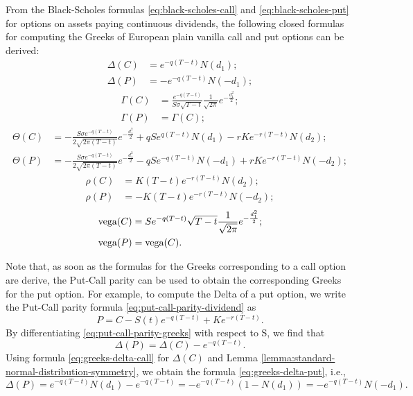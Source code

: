 From the Black-Scholes formulas \eqref{eq:black-scholes-call} and
    \eqref{eq:black-scholes-put} for options on assets paying continuous
    dividends, the following closed formulas for computing the Greeks of
    European plain vanilla call and put options can be derived:
\begin{align}
    \Delta(C) &= e^{-q(T-t)}N(d_1); \label{eq:greeks-delta-call} \\
    \Delta(P) &= -e^{-q(T-t)}N(-d_1); \label{eq:greeks-delta-put}
\end{align}
\begin{align}
    \Gamma(C) &= \frac{e^{-q(T-t)}}{S \sigma \sqrt{T - t}}
        \frac{1}{\sqrt{2 \pi}}e^{-\frac{d_1^2}{2}}; \\
    \Gamma(P) &= \Gamma(C);
\end{align}
\begin{align}
    \Theta(C) &= -\frac{S \sigma e^{-q(T-t)}}{2 \sqrt{2 \pi (T - t)}}
        e^{-\frac{d_1^2}{2}} + q S e^{q(T-t)} N(d_1) -
        r K e^{-r(T-t)} N(d_2); \\
    \Theta(P) &= -\frac{S \sigma e^{-q(T-t)}}{2 \sqrt{2 \pi (T - t)}}
        e^{-\frac{d_1^2}{2}} - q S e^{-q(T-t)} N(-d_1) +
        r K e^{-r(T-t)} N(-d_2);
\end{align}
\begin{align}
    \rho(C) &= K (T - t) e^{-r(T-t)} N(d_2); \\
    \rho(P) &= -K (T - t) e^{-r(T-t)} N(-d_2);
\end{align}
\begin{align}
    \text{vega}(C) &= S e^{-q(T-t)} \sqrt{T - t} \frac{1}{\sqrt{2 \pi}}
        e^{-\frac{d_1^2}{2}}; \\
    \text{vega}(P) &= \text{vega}(C).
\end{align}

Note that, as soon as the formulas for the Greeks corresponding to a call
    option are derive, the Put-Call parity can be used to obtain the
    corresponding Greeks for the put option.
For example, to compute the Delta of a put option, we write the Put-Call parity
    formula \eqref{eq:put-call-parity-dividend} as
\begin{equation}
    P = C - S(t) e^{-q (T - t)} + K e^{-r (T - t)}.
    \label{eq:put-call-parity-greeks}
\end{equation}
By differentiating \eqref{eq:put-call-parity-greeks} with respect to S, we find
    that
\begin{equation*}
    \Delta(P) = \Delta(C) - e^{-q(T-t)}.
\end{equation*}
Using formula \eqref{eq:greeks-delta-call} for $ \Delta(C) $ and Lemma
    \ref{lemma:standard-normal-distribution-symmetry}, we obtain the formula
    \eqref{eq:greeks-delta-put}, i.e.,
\begin{equation*}
    \Delta(P) = e^{-q(T-t)} N(d_1) - e^{-q(T-t)} = -e^{-q(T-t)} (1 - N(d_1)) =
        -e^{-q(T-t)} N(-d_1).
\end{equation*}
